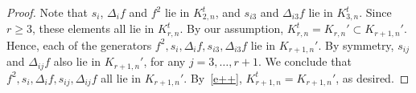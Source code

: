 \documentclass[12pt]{amsart}
\numberwithin{equation}{section}
\numberwithin{subsection}{section}
\theoremstyle{definition} \newtheorem{definition}[theorem]{Definition}
\begin{document}
\begin{proof}
Note that $s_i$, $\Delta_i f$ and $f^2$ lie in $K_{2, n}^t$, and
$s_{i3}$ and $\Delta_{i3} f$ lie in $K_{3, n}^t$. Since $r \geqslant 3$, 
these elements all lie in $K_{r, n}^t$. By our assumption, 
$K_{r, n}^t = K_{r, n}' \subset K_{r+1, n}'$. Hence, each of the generators
$f^2, s_i, \Delta_i f , s_{i3}, \Delta_{i3}f$ lie in $K_{r+1, n}'$. By symmetry, 
$s_{ij}$ and $\Delta_{ij}f$ also lie in $K_{r+1, n}'$, for any
$j = 3, \dots, r + 1$. We conclude that
$f^2, s_i, \Delta_i f , s_{ij}, \Delta_{ij}f$ all lie in
$K_{r+1, n}'$. By~\eqref{e++}, $K_{r+1, n}^t = K_{r+1, n}'$, as desired.
\end{proof}


 
\def\cprime{$'$}
\providecommand{\bysame}{\leavevmode\hbox to3em{\hrulefill}\thinspace}
\providecommand{\MR}{\relax\ifhmode\unskip\space\fi MR }
\providecommand{\MRhref}[2]{%
  \href{http://www.ams.org/mathscinet-getitem?mr=#1}{#2}
}
\providecommand{\href}[2]{#2}
\end{document}
